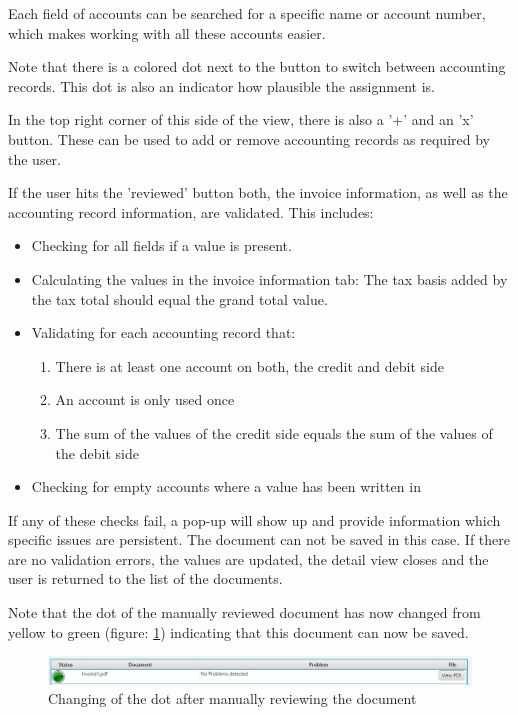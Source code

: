 Each field of accounts can be searched for a specific name or account number, which makes working with all these accounts easier.

Note that there is a colored dot next to the button to switch between accounting records. This dot is also an indicator how plausible the assignment is. 

In the top right corner of this side of the view, there is also a '+' and an 'x' button. These can be used to add or remove accounting records as required by the user.

If the user hits the 'reviewed' button both, the invoice information, as well as the accounting record information, are validated. This includes:
\begin{itemize}
	\item Checking for all fields if a value is present.
	\item Calculating the values in the invoice information tab: The tax basis added by the tax total should equal the grand total value.
	\item Validating for each accounting record that:
		\begin{enumerate}
			\item There is at least one account on both, the credit and debit side
			\item An account is only used once
			\item The sum of the values of the credit side equals the sum of the values of the debit side
		\end{enumerate}
	\item Checking for empty accounts where a value has been written in
\end{itemize}

If any of these checks fail, a pop-up will show up and provide information which specific issues are persistent. The document can not be saved in this case. If there are no validation errors, the values are updated, the detail view closes and the user is returned to the list of the documents.

Note that the dot of the manually reviewed document has now changed from yellow to green (figure: \ref{greenAfterReview}) indicating that this document can now be saved.

\begin{figure}[ht!]
\centering
\includegraphics[scale=0.6]{Images/GUI/GreenAfterReview.jpg}
\caption{Changing of the dot after manually reviewing the document \label{greenAfterReview}}
\end{figure}

